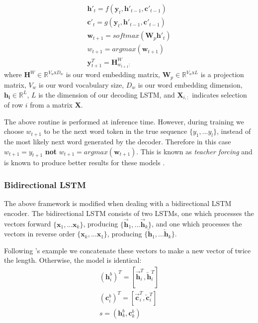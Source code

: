 \begin{align}
    \textbf{h}'_t = f(\textbf{y}_t, \textbf{h}'_{t-1}, \textbf{c}'_{t-1}) \label{eq:s2syh}\\
    \textbf{c}'_t = g(\textbf{y}_t, \textbf{h}'_{t-1}, \textbf{c}'_{t-1}) \label{eq:s2syc} \\
    \textbf{w}_{t+1} = softmax(\textbf{W}_p\textbf{h}'_t) \label{eq:decoder_w}  \\
    w_{t+1} = argmax(\textbf{w}_{t+1})  \\
    \textbf{y}^T_{t+1} = \textbf{H}^W_{w_{t+1}:}  
\end{align}
where $\textbf{H}^W \in \mathbb{R}^{V_w\text{x}D_w}$ is our word embedding matrix, 
$\textbf{W}_p \in \mathbb{R}^{V_w\text{x}L}$ is a projection matrix, $V_w$ is our word vocabulary size, 
$D_w$ is our word embedding dimension, 
$\mathbf{h_i} \in \mathbb{R}^L$,
$L$ is the dimension of our decoding LSTM,
and $\textbf{X}_{i,:}$ indicates selection of row $i$ from a matrix \textbf{X}.

The above routine is performed at inference time. However, during training we choose   $w_{t+1} $ to be the next word token  in the true sequence $\{y_1,...y_l\}$, instead of the most likely next word generated by the decoder. Therefore in this case $w_{t+1}  = y_{t+1}$ \textbf{not}  $w_{t+1} = argmax(\textbf{w}_{t+1})$. This is known as \textit{teacher forcing} and is known to produce better results for these models \citep{Goodfellow:2016:DL:3086952,r._j._williams_learning_1989}.

\subsubsection{Bidirectional LSTM}

The above framework is modified when dealing with a bidirectional LSTM encoder. The bidirectional LSTM consists of two LSTMs, one which processes the vectors forward $\{\textbf{x}_1,...\textbf{x}_k\}$, producing  $\{\overrightarrow{\textbf{h}}_1,...\overrightarrow{\textbf{h}}_k\}$, and one which processes the vectors in reverse order  $\{\textbf{x}_k,...\textbf{x}_1\}$, producing  $\{\overleftarrow{\textbf{h}}_1,...\overleftarrow{\textbf{h}}_k\}$.

Following \citet{bahdanau_neural_2014}'s example we concatenate these vectors to make a new vector of twice the length. Otherwise, the model is identical:
\begin{align}
(\textbf{h}^b_i)^T = [\overrightarrow{\textbf{h}}^T_i,\overleftarrow{\textbf{h}}^T_i ] \\
(\textbf{c}^b_i)^T = [\overrightarrow{\textbf{c}}^T_i,\overleftarrow{\textbf{c}}^T_i ] \\
s = (\textbf{h}^b_k, \textbf{c}^b_k)
\end{align}

